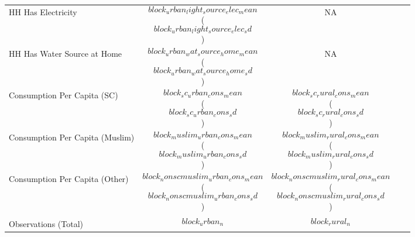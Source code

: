 {\begin{tabular}{lcccc}
  HH Has Electricity & $$block_urban_light_source_elec_mean$$ ($$block_urban_light_source_elec_sd$$) & NA  \\
  HH Has Water Source at Home  & $$block_urban_wat_source_home_mean$$ ($$block_urban_wat_source_home_sd$$) & NA \\
  Consumption Per Capita (SC) & $$block_sc_urban_cons_mean$$ ($$block_sc_urban_cons_sd$$) & $$block_sc_rural_cons_mean$$ ($$block_sc_rural_cons_sd$$) \\
  Consumption Per Capita (Muslim) & $$block_muslim_urban_cons_mean$$ ($$block_muslim_urban_cons_sd$$) & $$block_muslim_rural_cons_mean$$ ($$block_muslim_rural_cons_sd$$) \\
  Consumption Per Capita (Other) & $$block_nonscmuslim_urban_cons_mean$$ ($$block_nonscmuslim_urban_cons_sd$$) & $$block_nonscmuslim_rural_cons_mean$$ ($$block_nonscmuslim_rural_cons_sd$$) \\
  \\
  \hline
  Observations (Total)  &  $$block_urban_n$$  & $$block_rural_n$$  \\
  \hline
\end{tabular}
}
